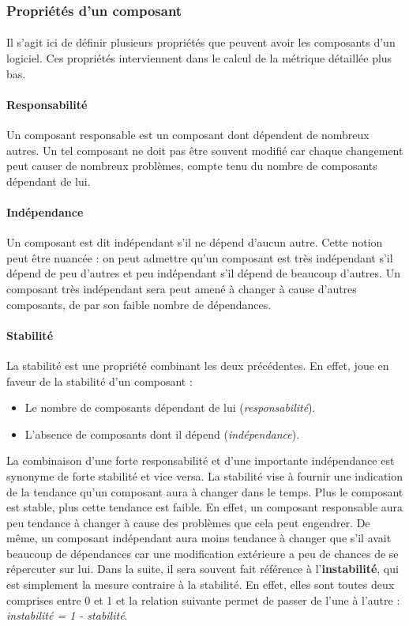 \documentclass{scrartcl}
\begin{document}
\subsubsection{Propriétés d'un composant}
\label{componentProperties}

    \paragraph{}Il s'agit ici de définir plusieurs propriétés que peuvent avoir les composants d'un logiciel. Ces propriétés interviennent dans le calcul de la métrique détaillée plus bas.
    
    \paragraph{Responsabilité}Un composant responsable est un composant dont dépendent de nombreux autres. Un tel composant ne doit pas être souvent modifié car chaque changement peut causer de nombreux problèmes, compte tenu du nombre de composants dépendant de lui.
    
    \paragraph{Indépendance}Un composant est dit indépendant s'il ne dépend d'aucun autre. Cette notion peut être nuancée : on peut admettre qu'un composant est très indépendant s'il dépend de peu d'autres et peu indépendant s'il dépend de beaucoup d'autres. Un composant très indépendant sera peut amené à changer à cause d'autres composants, de par son faible nombre de dépendances.
    
    \paragraph{Stabilité}La stabilité est une propriété combinant les deux précédentes. En effet, joue en faveur de la stabilité d'un composant :
    \begin{itemize}
        \item Le nombre de composants dépendant de lui (\emph{responsabilité}).
        \item L'absence de composants dont il dépend (\emph{indépendance}).
    \end{itemize}
    La combinaison d'une forte responsabilité et d'une importante indépendance est synonyme de forte stabilité et vice versa. La stabilité vise à fournir une indication de la tendance qu'un composant aura à changer dans le temps. Plus le composant est stable, plus cette tendance est faible. En effet, un composant responsable aura peu tendance à changer à cause des problèmes que cela peut engendrer. De même, un composant indépendant aura moins tendance à changer que s'il avait beaucoup de dépendances car une modification extérieure a peu de chances de se répercuter sur lui.
    Dans la suite, il sera souvent fait référence à l'\textbf{instabilité}, qui est simplement la mesure contraire à la stabilité. En effet, elles sont toutes deux comprises entre 0 et 1 et la relation suivante permet de passer de l'une à l'autre : \emph{instabilité = 1 - stabilité}.
    
\end{document}
